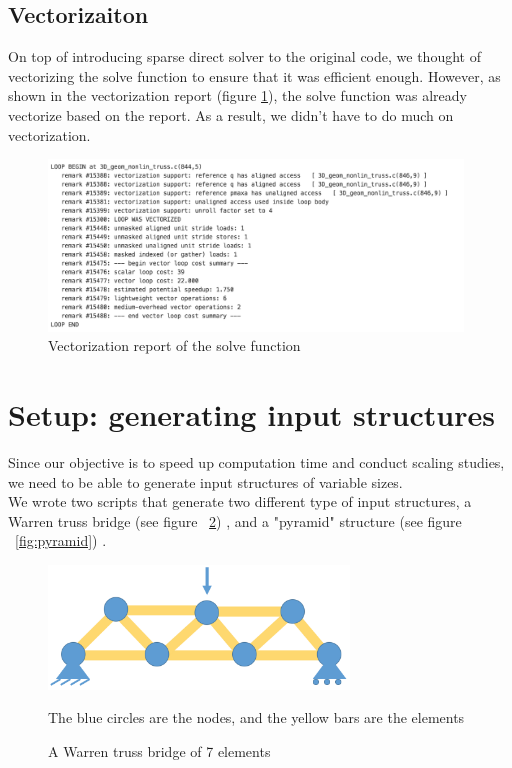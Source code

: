 \documentclass[11pt]{article}
\begin{document}
\subsection{Vectorizaiton}
On top of introducing sparse direct solver to the original code, we thought of vectorizing the solve function to ensure that it was efficient enough. However, as shown in the vectorization report (figure \ref{fig:vectorization}), the solve function was already vectorize based on the report. As a result, we didn't have to do much on vectorization. 

\begin{figure}[h]
	\begin{center}
		
		\includegraphics[width=11cm]{vectorization}
		\caption{Vectorization report of the solve function}
		\label{fig:vectorization}
	\end{center}
	
\end{figure}

\section{Setup: generating input structures}\label{sec:setup}

Since our objective is to speed up computation time and conduct scaling studies, we need to be able to generate input structures of variable sizes.\\

We wrote two scripts that generate two different type of input structures, a Warren truss bridge (see figure ~\ref{fig:chain}) , and a "pyramid" structure (see figure ~\ref{fig:pyramid}) .


\begin{figure}[h]
\begin{center}

\includegraphics[width=8cm]{chain}
\caption{A Warren truss bridge of 7 elements}
\label{fig:chain}
The blue circles are the nodes, and the yellow bars are the elements
\end{center}

\end{figure}
\end{document}
